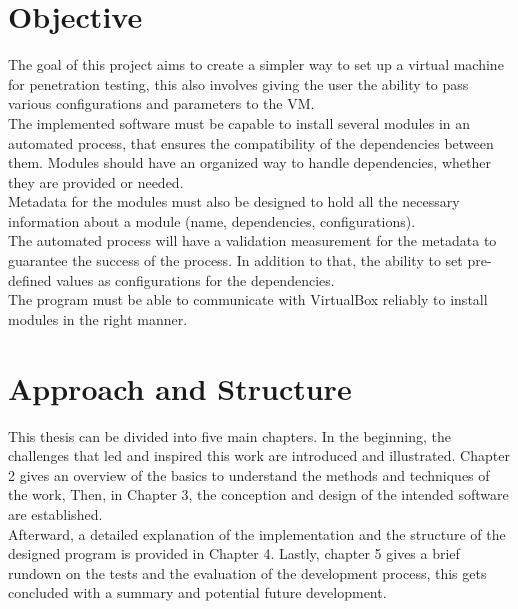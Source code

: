 \section{Objective}
The goal of this project aims to create a simpler way to set up a virtual machine for penetration testing, this also involves giving the user the ability to pass various configurations and parameters to the VM.\\
The implemented software must be capable to install several modules in an automated process, that ensures the compatibility of the dependencies between them. Modules should have an organized way to handle dependencies, whether they are provided or needed.\\
Metadata for the modules must also be designed to hold all the necessary information about a module (name, dependencies, configurations).\\
The automated process will have a validation measurement for the metadata to guarantee the success of the process. In addition to that, the ability to set pre-defined values as configurations for the dependencies.\\
The program must be able to communicate with VirtualBox reliably to install modules in the right manner.



\section{Approach and Structure}
This thesis can be divided into five main chapters. In the beginning, the challenges that led and inspired this work are introduced and illustrated. Chapter 2 gives an overview of the basics to understand the methods and techniques of the work, Then, in Chapter 3, the conception and design of the intended software are established.\\
Afterward, a detailed explanation of the implementation and the structure of the designed program is provided in Chapter 4. Lastly, chapter 5 gives a brief rundown on the tests and the evaluation of the development process, this gets concluded with a summary and potential future development.
